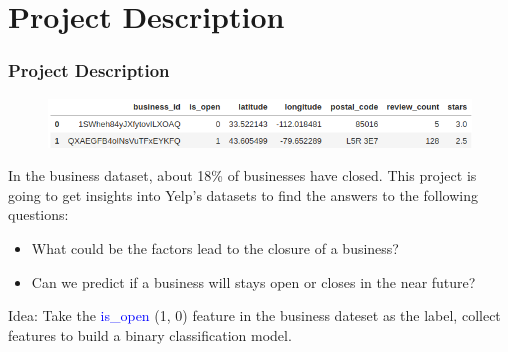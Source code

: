 \documentclass{beamer}
\begin{document}
\section{Project Description} %
\begin{frame}
\frametitle{Project Description}

\begin{figure}
	\includegraphics[width=.95\textwidth]{business_head}
\end{figure}


In the business dataset, about 18\% of businesses have closed. This project is going to get insights into Yelp's datasets to find the answers to the following questions:
\vspace{1em}
\begin{itemize}
	\item What could be the factors lead to the closure of a business?
	\item Can we predict if a business will stays open or closes in the near future?
\end{itemize}
\begin{block}{Idea:}
	Take the \textcolor{blue}{is\_open} (1, 0) feature in the business dateset as the label, collect features to build a binary classification model.
\end{block}

\end{frame}

\end{document}
